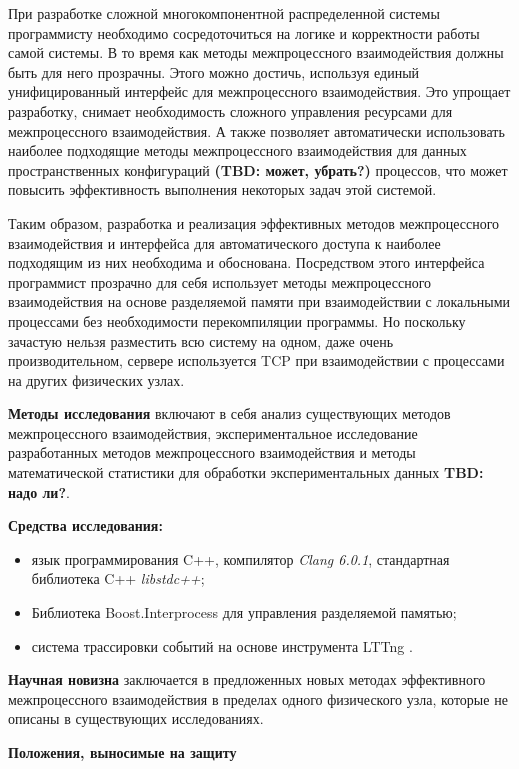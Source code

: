 При разработке сложной многокомпонентной распределенной системы программисту необходимо сосредоточиться на логике и корректности работы самой системы. В то время как методы межпроцессного взаимодействия должны быть для него прозрачны. Этого можно достичь, используя единый унифицированный интерфейс для межпроцессного взаимодействия. Это упрощает разработку, снимает необходимость сложного управления ресурсами для межпроцессного взаимодействия. А также позволяет автоматически использовать наиболее подходящие методы межпроцессного взаимодействия для данных пространственных конфигураций 
\textbf{(TBD: может, убрать?)}
процессов, что может повысить эффективность выполнения некоторых задач этой системой.

Таким образом, разработка и реализация эффективных методов межпроцессного взаимодействия и интерфейса для автоматического доступа к наиболее подходящим из них необходима и обоснована. Посредством этого интерфейса программист прозрачно для себя использует методы межпроцессного взаимодействия на основе разделяемой памяти при взаимодействии с локальными процессами без необходимости перекомпиляции программы. Но поскольку зачастую нельзя разместить всю систему на одном, даже очень производительном, сервере используется TCP при взаимодействии с процессами на других физических узлах.

\textbf{Методы исследования} включают в себя анализ существующих методов межпроцессного взаимодействия, экспериментальное исследование разработанных методов межпроцессного взаимодействия и методы математической статистики для обработки экспериментальных данных \textbf{TBD: надо ли?}.

\textbf{Средства исследования:}
\begin{itemize}
\item язык программирования C++, компилятор \textit{Clang 6.0.1}, стандартная библиотека C++ \textit{libstdc++};
\item Библиотека Boost.Interprocess \cite{BoostInterprocess} для управления разделяемой памятью;
\item система трассировки событий \cite{LTTngThesis} на основе инструмента LTTng \cite{LTTngSite}.
\end{itemize}

\textbf{Научная новизна} заключается в предложенных новых методах эффективного межпроцессного взаимодействия в пределах одного физического узла, которые не описаны в существующих исследованиях.

\textbf{Положения, выносимые на защиту}

